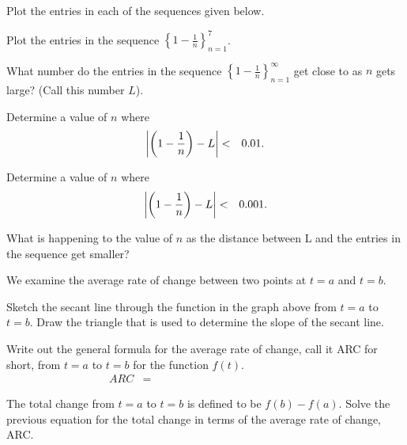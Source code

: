 \begin{problem}
\item Plot the entries in each of the sequences given below.
  \begin{subproblem}
    \item Plot the entries in the sequence $\left\{ 1-\frac{1}{n}\right\}_{n=1}^7$.

      \scalebox{0.7}{}

    \item What number do the entries in the sequence
      $\left\{ 1-\frac{1}{n}\right\}_{n=1}^\infty$ get close to as $n$
      gets large?  (Call this number $L$).

      \clearpage

    \item Determine a value of $n$ where
      \begin{eqnarray*}
        \left| \left( 1-\frac{1}{n} \right) - L \right| & < & 0.01.
      \end{eqnarray*}

      \vfill

    \item Determine a value of $n$ where
      \begin{eqnarray*}
        \left| \left( 1-\frac{1}{n}\right) - L \right| & < & 0.001.
      \end{eqnarray*}

      \vfill

    \item What is happening to the value of $n$ as the distance
      between L and the entries in the sequence get smaller?

      \vspace{3em}

  \end{subproblem}

  \clearpage

\item We examine the average rate of change between two points at
  $t=a$ and $t=b$.

  \scalebox{0.7}{}

  \begin{subproblem}
  \item Sketch the secant line through the function in the graph above
    from $t=a$ to $t=b$. Draw the triangle that is used to determine
    the slope of the secant line.
  \item Write out the general formula for the average rate of change,
    call it ARC for short, from $t=a$ to $t=b$ for the function
    $f(t)$.
    \begin{eqnarray*}
      ARC & = & ~~~~~~~~~~~~~~~~~~~~~~~~~~~~~~~~~~~~~~~~~~~~~~~~~~~~~~~~~~
    \end{eqnarray*}
    \vspace{2em}
  \item The total change from $t=a$ to $t=b$ is defined to be
    $f(b)-f(a)$. Solve the previous equation for the total change in
    terms of the average rate of change, ARC.
    \vfill
  \end{subproblem}


\end{problem}
